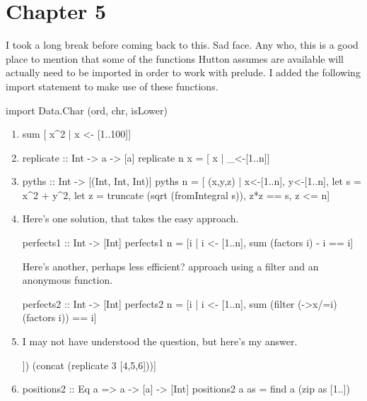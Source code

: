 \documentclass{article}
\begin{document}
\section{Chapter 5}
I took a long break before coming back to this. Sad face. Any who, this is a good place to mention that some of the functions Hutton assumes are available will actually need to be imported in order to work with prelude. I added the following import statement to make use of these functions. 
\begin{code}
import Data.Char (ord, chr, isLower)
\end{code}

\begin{enumerate}
\item
\begin{code}
sum [ x^2 | x <- [1..100]]
\end{code}

\item
\begin{code}
replicate :: Int -> a -> [a]
replicate n x = [ x | _<-[1..n]]
\end{code}

\item
\begin{code}
pyths :: Int -> [(Int, Int, Int)]
pyths n = [ (x,y,z) | x<-[1..n], y<-[1..n],
            let s = x^2 + y^2,
            let z = truncate (sqrt (fromIntegral s)),
            z*z == s, z <= n]
\end{code}

\item Here's one solution, that takes the easy approach.
\begin{code}
perfects1 :: Int -> [Int]
perfects1 n = [i | i <- [1..n], sum (factors i) - i == i]
\end{code}
Here's another, perhaps less efficient? approach using a filter and an anonymous function. 
\begin{code}
perfects2 :: Int -> [Int]
perfects2 n = [i | i <- [1..n], sum (filter (\x->x/=i) (factors i)) == i]
\end{code}

\item I may not have understood the question, but here's my answer.
\begin{code}
[ x | x<-zip (concat [replicate 3 i | i <- [1,2,3]]) (concat (replicate 3 [4,5,6]))]
\end{code}

\item 
\begin{code}
positions2 :: Eq a => a -> [a] -> [Int]
positions2 a as = find a (zip as [1..])
\end{code}


\end{enumerate}
\end{document}
